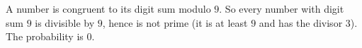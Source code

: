 A number is congruent to its digit sum modulo $9$. So every number with digit sum $9$ is divisible by $9$, hence is not prime (it is at least $9$ and has the divisor $3$). The probability is $\boxed{0}$.
